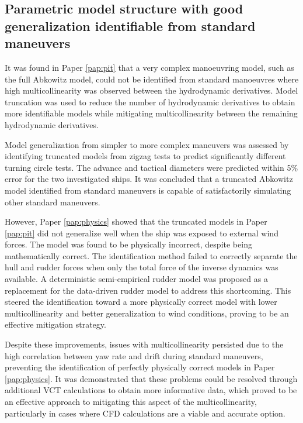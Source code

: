 \subsection*{Parametric model structure with good generalization identifiable from standard maneuvers}
It was found in Paper \ref{pap:pit} that a very complex manoeuvring model, such as the full Abkowitz model, could not be identified from standard manoeuvres where high multicollinearity was observed between the hydrodynamic derivatives. Model truncation was used to reduce the number of hydrodynamic derivatives to obtain more identifiable models while mitigating multicollinearity between the remaining hydrodynamic derivatives.

Model generalization from simpler to more complex maneuvers was assessed by identifying truncated models from zigzag tests to predict significantly different turning circle tests. The advance and tactical diameters were predicted within 5\% error for the two investigated ships. It was concluded that a truncated Abkowitz model identified from standard maneuvers is capable of satisfactorily simulating other standard maneuvers.

However, Paper \ref{pap:physics} showed that the truncated models in Paper \ref{pap:pit} did not generalize well when the ship was exposed to external wind forces. The model was found to be physically incorrect, despite being mathematically correct. The identification method failed to correctly separate the hull and rudder forces when only the total force of the inverse dynamics was available. A deterministic semi-empirical rudder model was proposed as a replacement for the data-driven rudder model to address this shortcoming. This steered the identification toward a more physically correct model with lower multicollinearity and better generalization to wind conditions, proving to be an effective mitigation strategy.

Despite these improvements, issues with multicollinearity persisted due to the high correlation between yaw rate and drift during standard maneuvers, preventing the identification of perfectly physically correct models in Paper \ref{pap:physics}. It was demonstrated that these problems could be resolved through additional VCT calculations to obtain more informative data, which proved to be an effective approach to mitigating this aspect of the multicollinearity, particularly in cases where CFD calculations are a viable and accurate option.

